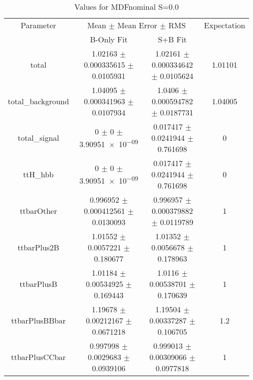 \begin{table}
\centering
\caption{Values for MDFnominal S=0.0}
\begin{tabular}{cccc}
\toprule
Parameter & \multicolumn{2}{c}{Mean $\pm$ Mean Error $\pm$ RMS} & Expectation\\
 & B-Only Fit & S+B Fit & \\
\midrule
total & \num{1.02163} $\pm$ \num{0.000335615} $\pm$ \num{0.0105931} & \num{1.02161} $\pm$ \num{0.000334642} $\pm$ \num{0.0105624} & \num{1.01101}\\
total\_background & \num{1.04095} $\pm$ \num{0.000341963} $\pm$ \num{0.0107934} & \num{1.0406} $\pm$ \num{0.000594782} $\pm$ \num{0.0187731} & \num{1.04005}\\
total\_signal & \num{0} $\pm$ \num{0} $\pm$ \num{3.90951e-09} & \num{0.017417} $\pm$ \num{0.0241944} $\pm$ \num{0.761698} & \num{0}\\
ttH\_hbb & \num{0} $\pm$ \num{0} $\pm$ \num{3.90951e-09} & \num{0.017417} $\pm$ \num{0.0241944} $\pm$ \num{0.761698} & \num{0}\\
ttbarOther & \num{0.996952} $\pm$ \num{0.000412561} $\pm$ \num{0.0130093} & \num{0.996957} $\pm$ \num{0.000379882} $\pm$ \num{0.0119789} & \num{1}\\
ttbarPlus2B & \num{1.01552} $\pm$ \num{0.0057221} $\pm$ \num{0.180677} & \num{1.01352} $\pm$ \num{0.0056678} $\pm$ \num{0.178963} & \num{1}\\
ttbarPlusB & \num{1.01184} $\pm$ \num{0.00534925} $\pm$ \num{0.169443} & \num{1.0116} $\pm$ \num{0.00538701} $\pm$ \num{0.170639} & \num{1}\\
ttbarPlusBBbar & \num{1.19678} $\pm$ \num{0.00212167} $\pm$ \num{0.0671218} & \num{1.19504} $\pm$ \num{0.00337287} $\pm$ \num{0.106705} & \num{1.2}\\
ttbarPlusCCbar & \num{0.997998} $\pm$ \num{0.0029683} $\pm$ \num{0.0939106} & \num{0.999013} $\pm$ \num{0.00309066} $\pm$ \num{0.0977818} & \num{1}\\
\bottomrule
\end{tabular}
\end{table}